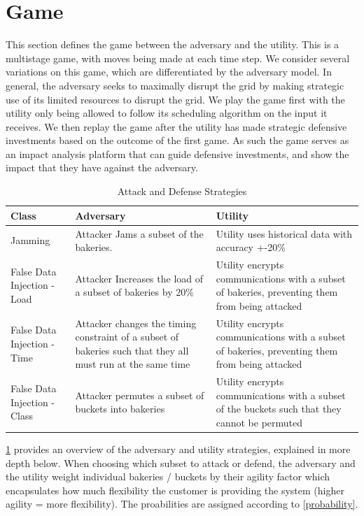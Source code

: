 \documentclass[conference]{IEEEtran}
\begin{document}
\section{Game}
\label{Game}

This section defines the game between the adversary and the utility. This is a multistage game, with moves being made at each time step. We consider several variations on this game, which are differentiated by the adversary model. In general, the adversary seeks to maximally disrupt the grid by making strategic use of its limited resources to disrupt the grid. We play the game first with the utility only being allowed to follow its scheduling algorithm on the input it receives. We then replay the game after the utility has made strategic defensive investments based on the outcome of the first game. As such the game serves as an impact analysis platform that can guide defensive investments, and show the impact that they have against the adversary.  

\begin{table}[!htbp]
\label{strategies}
\centering
\begin{tabular}{p{2cm} | p{3cm} | p{3cm}}
\toprule
Class & Adversary & Utility\\
\midrule
Jamming & Attacker Jams a subset of the bakeries.  & Utility uses historical data with accuracy +-20\% \\
False Data Injection - Load &  Attacker Increases the load of a subset of bakeries by 20\% & Utility encrypts communications with a subset of bakeries, preventing them from being attacked \\
False Data Injection - Time & Attacker changes the timing constraint of a subset of bakeries such that they all must run at the same time & Utility encrypts communications with a subset of bakeries, preventing them from being attacked \\
False Data Injection - Class & Attacker permutes a subset of buckets into bakeries & Utility encrypts communications with a subset of the buckets such that they cannot be permuted\\
\bottomrule
\end{tabular}
\caption{Attack and Defense Strategies}
\end{table}

\ref{strategies} provides an overview of the adversary and utility strategies, explained in more depth below.  When choosing which subset to attack or defend, the adversary and the utility weight individual bakeries / buckets by their agility factor \cite{petersen2013taxonomy} which encapsulates how much flexibility the customer
is providing the system (higher agility = more flexibility).  The proabilities are assigned according to \ref{probability}.
\end{document}

